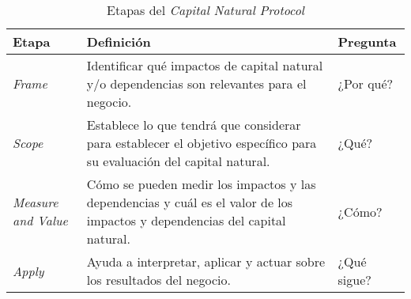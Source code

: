 
\begin{table}[h!]
    \centering
    \begin{tabular}{p{3.5cm} | p{8cm} | p{3cm}}
        \centering\textbf{Etapa} & \centering\textbf{Definición}  & \textbf{Pregunta} \\
        \hline\hline
        \textit{Frame} & Identificar qué impactos de capital natural y/o dependencias son relevantes para el negocio.  & ¿Por qué?\\
        \hline
        \textit{Scope} & Establece lo que tendrá que considerar para establecer el objetivo específico para su evaluación del capital natural. & ¿Qué? \\
        \hline
        \textit{Measure and Value} & Cómo se pueden medir los impactos y las dependencias y cuál es el valor de los impactos y dependencias del capital natural. & ¿Cómo? \\
        \hline
        \textit{Apply} & Ayuda a interpretar, aplicar y actuar sobre los resultados del negocio.  & ¿Qué sigue? \\
        \hline
    \end{tabular}
    \caption{Etapas del \textit{Capital Natural Protocol} \parencite{capitals-coalition-2021}}
    \label{tab:cnp-etapas}
\end{table}
